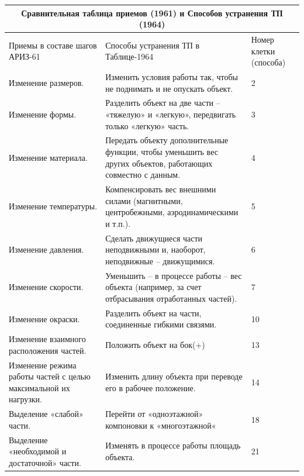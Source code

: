 \documentclass[11pt,a4paper]{article}
\begin{document}
\begin{center}
  \begin{tabular}{|p{}|p{}|p{}|}\hline
    \multicolumn{3}{|c|}{Сравнительная таблица приемов (1961) и Способов
      устранения ТП (1964)} \\\hline
    Приемы в составе шагов АРИЗ-61& Способы устранения ТП в Таблице-1964&
Номер клетки (способа)\\\hline
Изменение размеров. & Изменить условия работы так, чтобы не поднимать и не
опускать объект.& 2\\\hline
Изменение формы.& Разделить объект на две части -- «тяжелую» и «легкую»,
передвигать только «легкую» часть.& 3\\\hline
Изменение материала. & Передать объекту дополнительные функции, чтобы
уменьшить вес других объектов, работающих совместно с данным. & 4\\\hline
Изменение температуры. & Компенсировать вес внешними силами (магнитными,
центробежными, аэродинамическими и т.п.). & 5\\\hline
Изменение давления. & Сделать движущиеся части неподвижными и, наоборот,
неподвижные -- движущимися. & 6\\\hline
Изменение скорости.  & Уменьшить -- в процессе работы -- вес объекта
(например, за счет отбрасывания отработанных частей). & 7\\\hline
Изменение окраски.  & Разделить объект на части, соединенные гибкими
связями. & 10 \\\hline
Изменение взаимного расположения частей.  & Положить объект на бок(+) &
13\\\hline
Изменение режима работы частей с целью максимальной их нагрузки.  & Изменить
длину объекта при переводе его в рабочее положение. & 14\\\hline
Выделение «слабой» части.  & Перейти от «одноэтажной» компоновки к
«многоэтажной« & 18\\\hline
Выделение «необходимой и достаточной» части. & Изменять в процессе работы
площадь объекта. & 21\\\hline
  \end{tabular}


\end{center}
\end{document}
